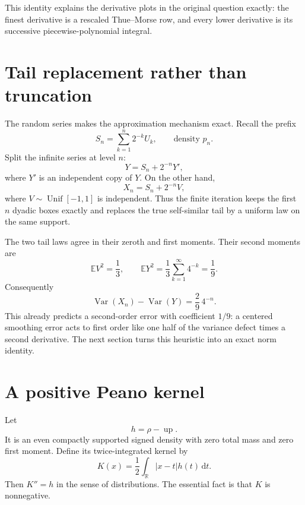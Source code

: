 \documentclass[11pt,oneside]{article}
\theoremstyle{definition}
\theoremstyle{remark}
\newcommand{\R}{\mathbb R}
\newcommand{\Up}{\operatorname{up}}
\newcommand{\E}{\mathbb E}
\newcommand{\Var}{\operatorname{Var}}
\newcommand{\dd}{\,\mathrm d}
\newcommand{\Unif}{\operatorname{Unif}}
\begin{document}
This identity explains the derivative plots in the original question exactly: the finest
derivative is a rescaled Thue--Morse row, and every lower derivative is its successive
piecewise-polynomial integral.

\section{Tail replacement rather than truncation}
\label{sec:tail-replacement}

The random series makes the approximation mechanism exact.  Recall the prefix
\begin{equation}
 S_n=\sum_{k=1}^{n}2^{-k}U_k,
 \qquad \text{density }p_n.                                \label{eq:Sn}
\end{equation}
Split the infinite series at level $n$:
\begin{equation}
 Y=S_n+2^{-n}Y',                                           \label{eq:Y-tail}
\end{equation}
where $Y'$ is an independent copy of $Y$.  On the other hand,
\begin{equation}
 X_n=S_n+2^{-n}V,                                          \label{eq:X-tail}
\end{equation}
where $V\sim\Unif[-1,1]$ is independent.  Thus the finite iteration keeps the first $n$
dyadic boxes exactly and replaces the true self-similar tail by a uniform law on the same
support.

The two tail laws agree in their zeroth and first moments.  Their second moments are
\begin{equation}
 \E V^2=\frac13,
 \qquad
 \E Y^2=\frac13\sum_{k=1}^{\infty}4^{-k}=\frac19.          \label{eq:tail-variances}
\end{equation}
Consequently
\begin{equation}
 \Var(X_n)-\Var(Y)=\frac29\,4^{-n}.                        \label{eq:variance-defect}
\end{equation}
This already predicts a second-order error with coefficient $1/9$: a centered smoothing
error acts to first order like one half of the variance defect times a second derivative.
The next section turns this heuristic into an exact norm identity.

\section{A positive Peano kernel}
\label{sec:Peano}

Let
\begin{equation}
 h=\rho-\Up.                                                \label{eq:h}
\end{equation}
It is an even compactly supported signed density with zero total mass and zero first moment.
Define its twice-integrated kernel by
\begin{equation}
 K(x)=\frac12\int_{\R}|x-t|h(t)\dd t.                      \label{eq:K-def}
\end{equation}
Then $K''=h$ in the sense of distributions.  The essential fact is that $K$ is nonnegative.
\end{document}
